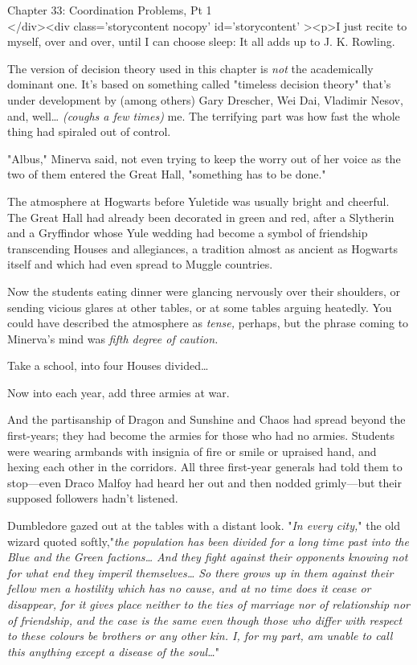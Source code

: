 
Chapter 33: Coordination Problems, Pt 1\\
</div><div  class='storycontent nocopy' id='storycontent' ><p>I just recite to 
myself, over and over, until I can choose sleep: It all adds up to J. K. 
Rowling.

The version of decision theory used in this chapter is \emph{not} the 
academically dominant one. It's based on something called "timeless decision 
theory" that's under development by (among others) Gary Drescher, Wei Dai, 
Vladimir Nesov, and, well{\ldots} \emph{(coughs a few times)} me.
\sbreak
The terrifying part was how fast the whole thing had spiraled out of control.

"Albus," Minerva said, not even trying to keep the worry out of her voice as 
the two of them entered the Great Hall, "something has to be done."

The atmosphere at Hogwarts before Yuletide was usually bright and cheerful. The 
Great Hall had already been decorated in green and red, after a Slytherin and a 
Gryffindor whose Yule wedding had become a symbol of friendship transcending 
Houses and allegiances, a tradition almost as ancient as Hogwarts itself and 
which had even spread to Muggle countries.

Now the students eating dinner were glancing nervously over their shoulders, or 
sending vicious glares at other tables, or at some tables arguing heatedly. You 
could have described the atmosphere as \emph{tense,} perhaps, but the phrase 
coming to Minerva's mind was \emph{fifth degree of caution.}

Take a school, into four Houses divided{\ldots}

Now into each year, add three armies at war.

And the partisanship of Dragon and Sunshine and Chaos had spread beyond the 
first-years; they had become the armies for those who had no armies. Students 
were wearing armbands with insignia of fire or smile or upraised hand, and 
hexing each other in the corridors. All three first-year generals had told them 
to stop---even Draco Malfoy had heard her out and then nodded grimly---but 
their supposed followers hadn't listened.

Dumbledore gazed out at the tables with a distant look. "\emph{In every city,}" 
the old wizard quoted softly,"\emph{the population has been divided for a long 
time past into the Blue and the Green factions{\ldots} And they fight against 
their opponents knowing not for what end they imperil themselves{\ldots} So 
there grows up in them against their fellow men a hostility which has no cause, 
and at no time does it cease or disappear, for it gives place neither to the 
ties of marriage nor of relationship nor of friendship, and the case is the 
same even though those who differ with respect to these colours be brothers or 
any other kin. I, for my part, am unable to call this anything except a disease 
of the soul{\ldots}}"

